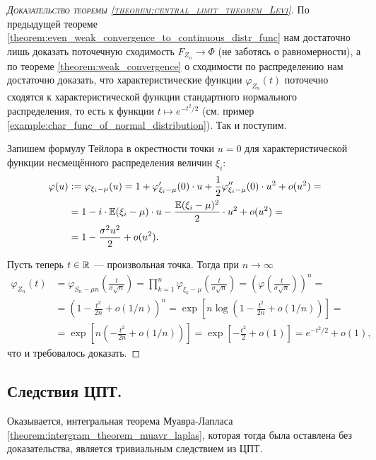 \documentclass[../main.tex]{subfiles}
\begin{document}
\begin{proof}[\normalfont\textsc{Доказательство теоремы \ref{theorem:central_limit_theorem_Levi}}]
 По предыдущей теореме \ref{theorem:even_weak_convergence_to_continuous_distr_func} нам достаточно лишь доказать поточечную сходимость $ F_{Z_n} \to \Phi $ (не заботясь о равномерности), а по теореме \ref{theorem:weak_convergence} о сходимости по распределению нам достаточно доказать, что характеристические функции $ \varphi_{Z_n}(t) $ поточечно сходятся к характеристической функции стандартного нормального распределения, то есть к функции $ t \mapsto e^{-t^{2} / 2} $ (см. пример \ref{example:char_func_of_normal_distribution}). Так и поступим.

 Запишем формулу Тейлора в окрестности точки $ u = 0 $ для характеристической функции несмещённого распределения величин $ \xi_i $:
 \begin{align*}
  \varphi(u) &:= \varphi_{\xi_i - \mu}(u) = 1 + \varphi_{\xi_i - \mu}'(0) \cdot u + \frac{1}{2}\varphi_{\xi_i - \mu}''(0) \cdot u^{2} + o(u^{2}) = \\
  &= 1 - i\cdot\mathbb E(\xi_i-\mu) \cdot u - \frac{\mathbb E(\xi_i - \mu)^{2}}{2} \cdot u^{2} + o(u^{2}) = \\
  &= 1 - \frac{\sigma^{2}u^{2}}{2} + o(u^{2}).
 \end{align*} 

 Пусть теперь $ t \in \mathbb{R} $ --- произвольная точка. Тогда при $ n \to \infty $
 \begin{align*}
  \varphi_{Z_n}(t) &= \varphi_{S_n - \mu n} \left( \frac{t}{\sigma\sqrt n} \right) = \prod_{k=1}^{n}\varphi_{\xi_k - \mu} \left( \frac{t}{\sigma \sqrt n} \right) = \left( \varphi \left( \frac{t}{\sigma\sqrt n} \right) \right)^{n} = \\
  &= \left( 1 - \frac{t^{2}}{2n} + o(1 / n) \right)^{n} = \exp \left[ n \log \left( 1 - \frac{t^{2}}{2n} + o(1 / n) \right) \right] = \\
  &= \exp \left[ n \left( - \frac{t^{2}}{2n} + o(1 / n) \right) \right] = \exp \left[ -\frac{t^{2}}{2} + o(1) \right] = e^{-t^{2} / 2} + o(1),
 \end{align*} что и требовалось доказать.
\end{proof}

\subsection{Следствия ЦПТ.}

Оказывается, интегральная теорема Муавра-Лапласа \ref{theorem:intergram_theorem_muavr_laplas}, которая тогда была оставлена без доказательства, является тривиальным следствием из ЦПТ.
\end{document}
